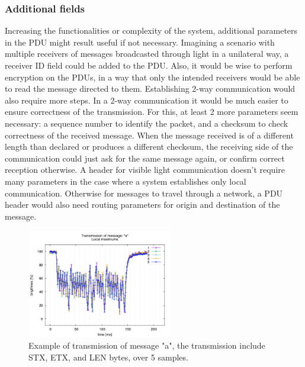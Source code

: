 \subsubsection{Additional fields}
Increasing the functionalities or complexity of the system, additional parameters in the PDU might result useful if not necessary. 
Imagining a scenario with multiple receivers of messages broadcasted through light in a unilateral way, a receiver ID field could be added to the PDU.
 Also, it would be wise to perform encryption on the PDUs, in a way that only the intended receivers would be able to read the message directed to them.
Establishing 2-way communication would also require more steps.
In a 2-way communication it would be much easier to ensure correctness of the transmission. 
For this, at least 2 more parameters seem necessary: a sequence number to identify the packet, and a checksum to check correctness of the received message.
When the message received is of a different length than declared or produces a different checksum, the receiving side of the communication could just ask  for the same message again, or confirm correct reception otherwise.
A header for visible light communication doesn't require many parameters in the case where a system establishes only local communication.
Otherwise for messages to travel through a network, a PDU header would also need routing parameters for origin and destination of the message.

\begin{figure}
\centering
\includegraphics[height=180px]{img/transmission}
\caption{Example of transmission of message "a", the transmission include STX, ETX, and LEN bytes, over 5 samples.}
\label{fig:transmissionA}
\end{figure}

